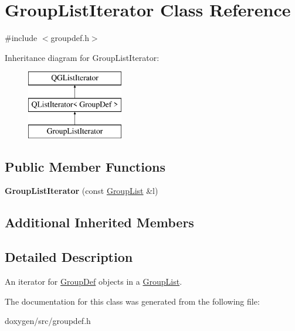 \hypertarget{class_group_list_iterator}{}\section{Group\+List\+Iterator Class Reference}
\label{class_group_list_iterator}


{\ttfamily \#include $<$groupdef.\+h$>$}

Inheritance diagram for Group\+List\+Iterator\+:\begin{figure}[H]
\begin{center}
\leavevmode
\includegraphics[height=3.000000cm]{class_group_list_iterator}
\end{center}
\end{figure}
\subsection*{Public Member Functions}
\begin{DoxyCompactItemize}
\item 
\mbox{\label{class_group_list_iterator_a8b569b278f3287e4a3b7dd3f1cf91227}} 
{\bfseries Group\+List\+Iterator} (const \mbox{\hyperlink{class_group_list}{Group\+List}} \&l)
\end{DoxyCompactItemize}
\subsection*{Additional Inherited Members}


\subsection{Detailed Description}
An iterator for \mbox{\hyperlink{class_group_def}{Group\+Def}} objects in a \mbox{\hyperlink{class_group_list}{Group\+List}}. 

The documentation for this class was generated from the following file\+:\begin{DoxyCompactItemize}
\item 
doxygen/src/groupdef.\+h\end{DoxyCompactItemize}
